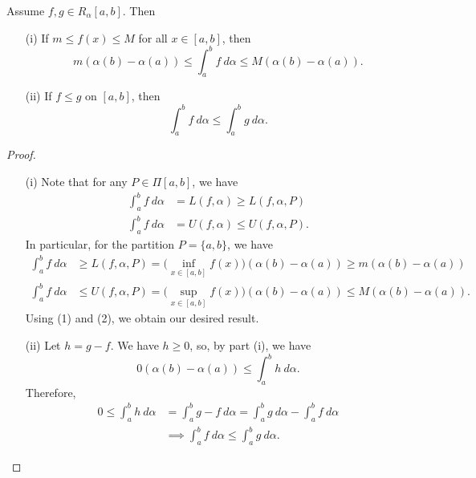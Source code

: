 \begin{theorem}
    Assume \( f,g \in {R}_{\alpha}[a,b] \). Then
    \begin{enumerate}
        \item[(i)] If \( m \leq f(x) \leq M  \) for all \( x\in [a,b] \), then 
            \[  m (\alpha(b) - \alpha(a)) \leq \int_{ a }^{ b }  f  \ d \alpha \leq M(\alpha(b) - \alpha(a)). \]
        \item[(ii)] If \( f \leq g  \) on \( [a,b] \), then
            \[  \int_{ a }^{ b }  f  \ d \alpha \leq \int_{ a }^{ b } g   \ d \alpha. \]
    \end{enumerate}
\end{theorem}
\begin{proof}
\begin{enumerate}
    \item[(i)] Note that for any \( P \in \Pi[a,b] \), we have 
        \begin{align*}
            \int_{ a }^{ b }  f  \ d \alpha &= L(f,\alpha) \geq L(f,\alpha,P) \\
            \int_{ a }^{ b }  f \ d \alpha &= U(f,\alpha) \leq U(f,\alpha,P).
        \end{align*}
        In particular, for the partition \( P = \{ a,b \}  \), we have 
        \begin{align*}
            \int_{ a }^{ b }  f  \ d \alpha &\geq L(f,\alpha, P) = \Big(  \inf_{x \in [a,b]} f(x) \Big) (\alpha(b) - \alpha(a)) \geq m (\alpha(b) - \alpha(a)) \tag{1} \\
            \int_{ a }^{ b }  f  \ d \alpha &\leq U(f,\alpha,P) = \Big(  \sup_{x \in [a,b]} f(x) \Big) (\alpha(b) - \alpha(a)) \leq M (\alpha(b) - \alpha(a)). \tag{2}
        \end{align*}
        Using (1) and (2), we obtain our desired result.
    \item[(ii)] Let \( h = g - f  \). We have \( h \geq 0  \), so, by part (i), we have
        \[  0 (\alpha(b) - \alpha(a)) \leq \int_{ a }^{ b }  h  \ d \alpha. \]
        Therefore, 
        \begin{align*}
            0 \leq \int_{ a }^{ b } h \ d \alpha &= \int_{ a }^{ b } g - f  \ d \alpha = \int_{ a }^{ b }  g  \ d \alpha - \int_{ a }^{ b }  f  \ d \alpha \\
                                                 &\implies \int_{ a }^{ b } f  \ d \alpha \leq \int_{ a }^{ b }  g  \ d \alpha.
        \end{align*}
\end{enumerate}
\end{proof}

